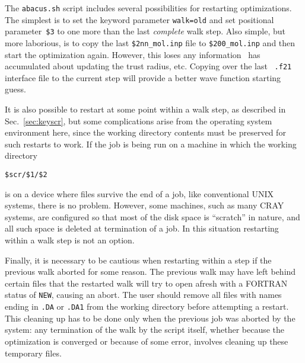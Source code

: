 The \verb|abacus.sh| script includes several possibilities for
restarting optimizations.  The simplest is to set the keyword
parameter \verb|walk=old| and set positional parameter~\verb|$3|
to one more than the last {\em complete\/} walk step.  Also
simple, but more laborious, is to copy the last
\verb|$2nn_mol.inp| file to \verb|$200_mol.inp| and then start the
optimization again.  However, this loses any information \aba\ has
accumulated about updating the trust radius, etc.  Copying over
the last \sir\ \verb|.f21| interface file to the current step will
provide a better wave function starting guess.

It is also possible to restart at some point within a walk step,
as described in Sec.~\ref{sec:keyscr},
but some complications arise from the operating system
environment here, since the working directory contents must be
preserved for such restarts to work.  If the job is being run on a
machine in which the working directory
\begin{verbatim}
$scr/$1/$2
\end{verbatim}
is on a device where files survive the end of a job, like
conventional UNIX systems, there is no problem.  However, some
machines, such as many CRAY systems, are configured so that most
of the disk space is ``scratch'' in nature, and all such space is
deleted at termination of a job.  In this situation restarting
within a walk step is not an option.  

Finally, it is necessary to
be cautious when restarting within a step if the previous walk
aborted for some reason.  The previous walk may have left behind
certain files that the restarted walk will try to open afresh with
a FORTRAN status of \verb|NEW|, causing an abort.  The user should
remove all files with names ending in \verb|.DA| or \verb|.DA1|
from the working directory before attempting a restart.  This
cleaning up has to be done only
when the previous job was aborted by the system:
any termination of the walk by the script itself, whether because
the optimization is converged or because of some error, involves
cleaning up these temporary files.
